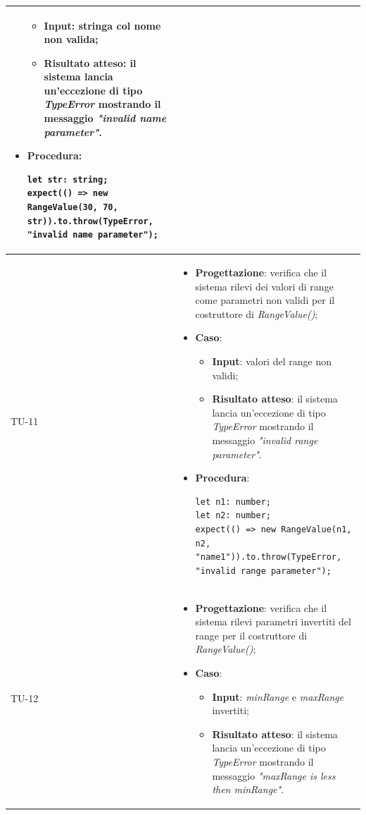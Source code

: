 \begin{longtable}{|C{1.5cm}|C{14.5cm}|}
\begin{itemize}
		\begin{itemize}
			\item \textbf{Input}: stringa col nome non valida;
			\item \textbf{Risultato atteso}: il sistema lancia un'eccezione di tipo \emph{TypeError} mostrando il messaggio \emph{"invalid name parameter"}.
		\end{itemize}
		\item \textbf{Procedura}:
		\begin{lstlisting}
let str: string;
expect(() => new RangeValue(30, 70, str)).to.throw(TypeError, "invalid name parameter");		
		\end{lstlisting}
	\end{itemize}\\
	\hline
	{TU-11} &  
	\begin{itemize}
		\item \textbf{Progettazione}: verifica che il sistema rilevi dei valori di range come parametri non validi per il costruttore di \emph{RangeValue()};
		\item \textbf{Caso}: 
		\begin{itemize}
			\item \textbf{Input}: valori del range non validi;
			\item \textbf{Risultato atteso}: il sistema lancia un'eccezione di tipo \emph{TypeError} mostrando il messaggio \emph{"invalid range parameter"}.
		\end{itemize}
		\item \textbf{Procedura}:
		\begin{lstlisting}
let n1: number;
let n2: number;
expect(() => new RangeValue(n1, n2, "name1")).to.throw(TypeError, "invalid range parameter");		
		\end{lstlisting}
	\end{itemize}\\
	\hline
	{TU-12} &  
	\begin{itemize}
		\item \textbf{Progettazione}: verifica che il sistema rilevi parametri invertiti del range per il costruttore di \emph{RangeValue()};
		\item \textbf{Caso}: 
		\begin{itemize}
			\item \textbf{Input}: \emph{minRange} e \emph{maxRange} invertiti;
			\item \textbf{Risultato atteso}: il sistema lancia un'eccezione di tipo \emph{TypeError} mostrando il messaggio \emph{"maxRange is less then minRange"}.

\end{itemize}
\end{itemize}
\end{longtable}
